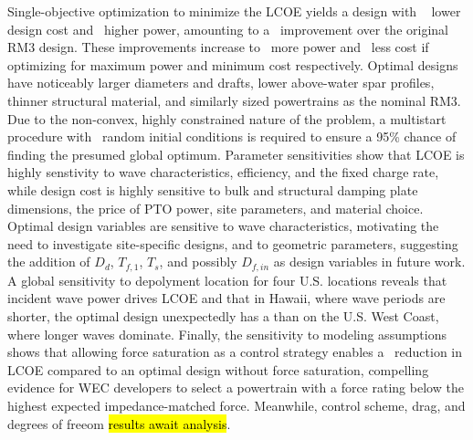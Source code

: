 \documentclass[preprint,12pt]{elsarticle}
\begin{document}
Single-objective optimization to minimize the LCOE yields a design with \pctImproveDesignCostMinLCOE~ lower design cost and \pctImproveDesignCostMinLCOE~higher power, amounting to a \pctImproveLCOEMinLCOE~improvement over the original RM3 design.
These improvements increase to \pctImprovePowerMaxPower~more power and \pctImproveDesignCostMinCapex~less cost if optimizing for maximum power and minimum cost respectively. 
Optimal designs have noticeably larger diameters and drafts, lower above-water spar profiles, thinner structural material, and similarly sized powertrains as the nominal RM3.
Due to the non-convex, highly constrained nature of the problem, a multistart procedure with \numMultistartRequired~random initial conditions is required to ensure a 95\% chance of finding the presumed global optimum.
Parameter sensitivities show that LCOE is highly senstivity to wave characteristics, efficiency, and the fixed charge rate, while design cost is highly sensitive to bulk and structural damping plate dimensions, the price of PTO power, site parameters, and material choice.
Optimal design variables are sensitive to wave characteristics, motivating the need to investigate site-specific designs, and to geometric parameters, suggesting the addition of $D_d$, $T_{f,1}$, $T_s$, and possibly $D_{f,in}$ as design variables in future work.
A global sensitivity to depolyment location for four U.S. locations reveals that incident wave power drives LCOE and that in Hawaii, where wave periods are shorter, the optimal design unexpectedly has a \HawaiiDesignCharacteristics than on the U.S. West Coast, where longer waves dominate. 
Finally, the sensitivity to modeling assumptions shows that allowing force saturation as a control strategy enables a \pctImproveLCOEForceSatOptMinLCOE~reduction in LCOE compared to an optimal design without force saturation, compelling evidence for WEC developers to select a powertrain with a force rating below the highest expected impedance-matched force.
Meanwhile, control scheme, drag, and degrees of freeom \hl{results await analysis}.
\end{document}
